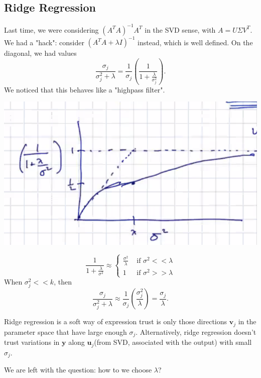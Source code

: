 \documentclass[11pt]{article}
\newcommand{\Vu}{\mathbf{u}}
\newcommand{\Vv}{\mathbf{v}}
\newcommand{\Vy}{\mathbf{y}}
\begin{document}
\subsection{Ridge Regression}
Last time, we were considering $(A^TA)^{-1}A^T$ in the SVD sense, with $A = U \Sigma V^T$.  We had a "hack":  consider $(A^TA + \lambda I)^{-1}$ instead, which is well defined.  On the diagonal, we had values 
$$\frac{\sigma_j}{\sigma_j^2 + \lambda} = \frac{1}{\sigma_j}\left (\frac{1}{1 + \frac{\lambda}{\sigma_j^2}}\right).$$
We noticed that this behaves like a "highpass filter".
\begin{center}
\includegraphics[scale=0.5]{images/graph.png}
\end{center}
$$\frac{1}{1 + \frac{\lambda}{\sigma^2}} \approx \begin{cases}
\frac{\sigma^2}{\lambda} & \text{ if } \sigma^2 << \lambda \\ 
1 & \text{ if } \sigma^2 >> \lambda 
\end{cases}$$
When $\sigma_j^2 << k$, then $$\frac{\sigma_j}{\sigma_j^2 + \lambda} \approx \frac{1}{\sigma_j}\left (\frac{\sigma_j^2}{\lambda}\right ) = \frac{\sigma_j}{\lambda}.$$

Ridge regression is a soft way of expression trust is only those directions $\Vv_j$ in the parameter space that have large enough $\sigma_j$.  Alternatively, ridge regression doesn't trust variations in $\Vy$ along $\Vu_j$(from SVD, associated with the output) with small $\sigma_j$.

We are left with the question: how to we choose $\lambda$?
\end{document}
